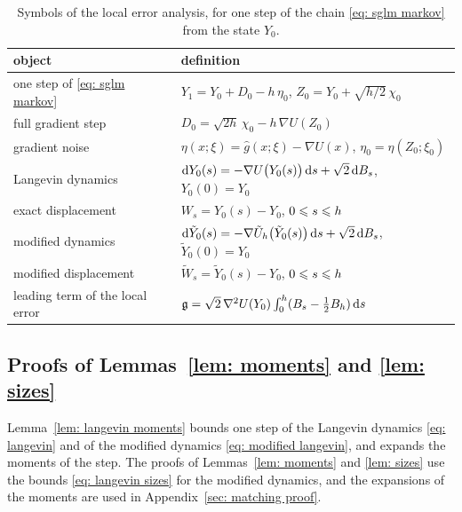 \begin{table}[htbp]
\centering
\begin{tabular}{ll}
\toprule
object & definition \\
\midrule
one step of \eqref{eq: sglm markov} & $Y_1 = Y_0 + D_0 - h\, \eta_0$, \quad $Z_0 = Y_0 + \sqrt{h/2}\, \chi_0$ \\
full gradient step & $D_0 = \sqrt{2h}\, \chi_0 - h\, \nabla U(Z_0)$ \\
gradient noise & $\eta(x;\xi) = \hat g(x;\xi) - \nabla U(x)$, \quad $\eta_0 = \eta(Z_0;\xi_0)$ \\
Langevin dynamics & $\mathrm{d} Y_0(s) = -\nabla U\bigl( Y_0(s) \bigr)\, \mathrm{d} s + \sqrt2\, \mathrm{d} B_s$, \quad $Y_0(0) = Y_0$ \\
exact displacement & $W_s = Y_0(s) - Y_0$, \quad $0 \leqslant s \leqslant h$ \\
modified dynamics & $\mathrm{d} \tilde Y_0(s) = -\nabla \tilde U_h\bigl( \tilde Y_0(s) \bigr)\, \mathrm{d} s + \sqrt2\, \mathrm{d} B_s$, \quad $\tilde Y_0(0) = Y_0$ \\
modified displacement & $\tilde W_s = \tilde Y_0(s) - Y_0$, \quad $0 \leqslant s \leqslant h$ \\
leading term of the local error & $\mathfrak g = \sqrt2\, \nabla^2 U(Y_0) \int_0^h ( B_s - \frac12 B_h )\, \mathrm{d} s$ \\
\bottomrule
\end{tabular}
\caption{Symbols of the local error analysis, for one step of the chain \eqref{eq: sglm markov} from the state $Y_0$.}
\label{tab: local symbols}
\end{table}

\subsection{Proofs of Lemmas~\ref{lem: moments} and \ref{lem: sizes}}
\label{sec: moments proof}

Lemma~\ref{lem: langevin moments} bounds one step of the Langevin dynamics \eqref{eq: langevin} and of the modified dynamics \eqref{eq: modified langevin}, and expands the moments of the step. The proofs of Lemmas~\ref{lem: moments} and \ref{lem: sizes} use the bounds \eqref{eq: langevin sizes} for the modified dynamics, and the expansions of the moments are used in Appendix~\ref{sec: matching proof}.

